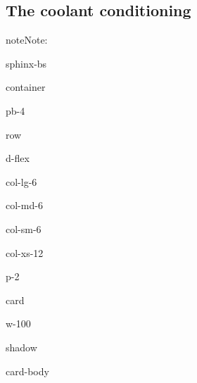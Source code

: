 \documentclass[letterpaper,10pt,english]{jupyterBook}
\begin{document}
\subsection{The coolant conditioning}
\label{\detokenize{06_Starting_An_instance:the-coolant-conditioning}}
\begin{sphinxadmonition}{note}{Note:}
\sphinxAtStartPar
{}

\begin{sphinxuseclass}{sphinx-bs}
\begin{sphinxuseclass}{container}
\begin{sphinxuseclass}{pb-4}
\begin{sphinxuseclass}{row}
\begin{sphinxuseclass}{d-flex}
\begin{sphinxuseclass}{col-lg-6}
\begin{sphinxuseclass}{col-md-6}
\begin{sphinxuseclass}{col-sm-6}
\begin{sphinxuseclass}{col-xs-12}
\begin{sphinxuseclass}{p-2}
\begin{sphinxuseclass}{card}
\begin{sphinxuseclass}{w-100}
\begin{sphinxuseclass}{shadow}
\begin{sphinxuseclass}{card-body}
\sphinxAtStartPar
{}


\end{sphinxuseclass}
\end{sphinxuseclass}
\end{sphinxuseclass}
\end{sphinxuseclass}
\end{sphinxuseclass}
\end{sphinxuseclass}
\end{sphinxuseclass}
\end{sphinxuseclass}
\end{sphinxuseclass}
\end{sphinxuseclass}
\end{sphinxuseclass}
\end{sphinxuseclass}
\end{sphinxuseclass}
\end{sphinxuseclass}
\end{sphinxadmonition}
\end{document}
